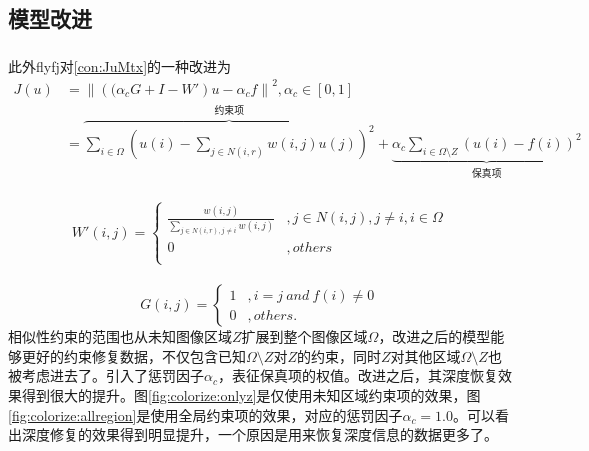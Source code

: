 \documentclass[UTF8]{ctexart}
\newcommand{\myciteup}[1]{\textsuperscript{\textsuperscript{\cite{#1}}}}
\begin{document}
\begin{sloppypar}
    \subsection{模型改进}
    此外flyfj\myciteup{flyfj2015}对\eqref{con:JuMtx}的一种改进为
    \begin{equation}
        \begin{aligned}
            J(u) &= \left\| \left( (\alpha_c G + I - W' \right) u - \alpha_c f \right\|^2, \alpha_c \in \left[ 0,1 \right]\\
                 &= \overbrace{\sum\limits_{i\in \Omega}\left(  u(i)-\sum\limits_{j\in N(i,r)}w(i,j)u(j)\right)^2}^{\mbox{约束项}} + \underbrace{\alpha_c\sum\limits_{i\in \Omega\setminus Z}(u(i) - f(i))^2}_{\mbox{保真项}}
        \end{aligned}
        \label{con:JuMtxAdvanced}
    \end{equation}\\
    \begin{equation}
        W'(i,j) = \left\{
        \begin{array}{cc}
            \frac{w(i,j)}{\sum\limits_{j\in N(i,r),j\neq i}w(i,j)}&,j \in N(i,j),j \neq i, i\in \Omega \\
            0&, others\\
        \end{array} \right.
        \label{con:WAdvanced}
    \end{equation}\\
    \begin{equation}
        G(i,j) = \left\{
        \begin{aligned}
            1&,i=j\ and\ f(i) \neq 0\\
            0&,others.
        \end{aligned}
        \right.
    \end{equation}
    相似性约束的范围也从未知图像区域$Z$扩展到整个图像区域$\Omega$，改进之后的模型能够更好的约束修复数据，不仅包含已知$\Omega\setminus Z$对$Z$的约束，同时$Z$对其他区域$\Omega\setminus Z$也被考虑进去了。引入了惩罚因子$\alpha_c$，表征保真项的权值。改进之后，其深度恢复效果得到很大的提升。图\ref{fig:colorize:onlyz}是仅使用未知区域约束项的效果，图\ref{fig:colorize:allregion}是使用全局约束项的效果，对应的惩罚因子$\alpha_c = 1.0$。可以看出深度修复的效果得到明显提升，一个原因是用来恢复深度信息的数据更多了。 \par
    \begin{figure}[htbp]
        \begin{minipage}[t]{0.5\linewidth}

\end{minipage}
\end{figure}
\end{sloppypar}
\end{document}
